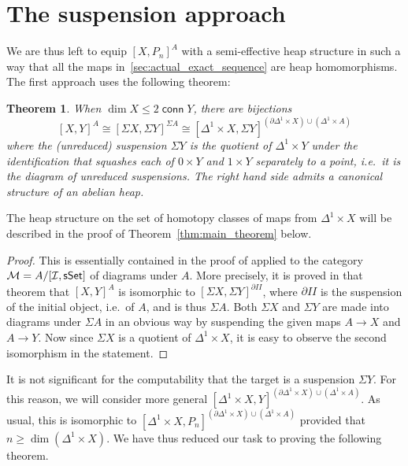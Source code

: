 \documentclass[12pt,a4wide]{article}
\theoremstyle{plain}
\newtheorem{theorem}{Theorem}[section]
\theoremstyle{definition}
\newcommand{\conn}{\mathop{\mathsf{conn}}}
\newcommand{\thedim}{{n}}
\newcommand{\stdsimp}[1]{\Delta^{#1}}
\newcommand{\Pnew}{{P_\thedim}}
\renewcommand\:{\colon}
\begin{document}
\section{The suspension approach}

We are thus left to equip $[X, \Pnew]^A$ with a semi-effective heap structure in such a way that all the maps in~\ref{sec:actual_exact_sequence} are heap homomorphisms. The first approach uses the following theorem:

\begin{theorem} \label{thm:stable_situation_heaps}
When $\dim X \leq 2 \conn Y$, there are bijections
\[[X, Y]^A \cong [\Sigma X, \Sigma Y]^{\Sigma A} \cong [\Delta^1 \times X, \Sigma Y]^{(\partial \Delta^1 \times X) \cup (\Delta^1 \times A)}\]
where the (unreduced) suspension $\Sigma Y$ is the quotient of $\Delta^1 \times Y$ under the identification that squashes each of $0 \times Y$ and $1 \times Y$ separately to a point, i.e.\ it is the diagram of unreduced suspensions. The right hand side admits a canonical structure of an abelian heap.
\end{theorem}

The heap structure on the set of homotopy classes of maps from $\stdsimp 1 \times X$ will be described in the proof of Theorem~\ref{thm:main_theorem} below.

\begin{proof}
This is essentially contained in the proof of \cite[Theorem~1.1]{heaps} applied to the category $\mathcal M = A / [\mathcal I, \mathsf{s}\mathsf{Set}]$ of diagrams under $A$. More precisely, it is proved in that theorem that $[X, Y]^A$ is isomorphic to $[\Sigma X, \Sigma Y]^{\partial I\!\!I}$, where $\partial I\!\!I$ is the suspension of the initial object, i.e.\ of $A$, and is thus $\Sigma A$. Both $\Sigma X$ and $\Sigma Y$ are made into diagrams under $\Sigma A$ in an obvious way by suspending the given maps $A \to X$ and $A \to Y$. Now since $\Sigma X$ is a quotient of $\stdsimp 1 \times X$, it is easy to observe the second isomorphism in the statement.
\end{proof}

It is not significant for the computability that the target is a suspension $\Sigma Y$. For this reason, we will consider more general $[\Delta^1 \times X, Y]^{(\partial \Delta^1 \times X) \cup (\Delta^1 \times A)}$. As usual, this is isomorphic to $[\Delta^1 \times X, P_n]^{(\partial \Delta^1 \times X) \cup (\Delta^1 \times A)}$ provided that $n \geq \dim(\stdsimp 1 \times X)$. We have thus reduced our task to proving the following theorem.
\end{document}
